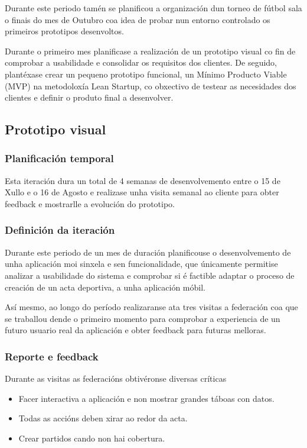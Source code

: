   Durante este periodo tamén se planificou a organización dun torneo de fútbol 
sala o finais do mes de Outubro coa idea de probar nun entorno 
controlado os primeiros prototipos desenvoltos.

  Durante o primeiro mes planificase a realización de un prototipo visual co 
fin de comprobar a usabilidade e consolidar os requisitos dos clientes.
  De seguido, plantéxase crear un pequeno prototipo funcional, un Mínimo 
Producto Viable (MVP) na metodoloxía Lean Startup, co obxectivo de testear as 
necesidades dos clientes e definir o produto final a desenvolver.

    \subsection{Prototipo visual}

      \subsubsection{Planificación temporal}
      Esta iteración dura un total de 4 semanas de desenvolvemento entre o 15 
de Xullo e o 16 de Agosto e realizase unha visita semanal ao cliente para obter 
feedback e mostrarlle a evolución do prototipo.

      \subsubsection{Definición da iteración}
      Durante este periodo de un mes de duración planificouse o desenvolvemento 
de unha aplicación moi sinxela e sen funcionalidade, que únicamente permitise 
analizar a usabilidade do sistema e comprobar si é factible adaptar o proceso 
de creación de un acta deportiva, a unha aplicación móbil.

    Así mesmo, ao longo do período realizaranse ata tres visitas a federación 
coa que se traballou dende o primeiro momento para comprobar a experiencia de 
un futuro usuario real da aplicación e obter feedback para futuras melloras.

      \subsubsection{Reporte e feedback}
      Durante as visitas as federacións obtivéronse diversas críticas 
      \begin{itemize}
        \item Facer interactiva a aplicación e non mostrar grandes táboas con 
datos.
        \item Todas as accións deben xirar ao redor da acta.
        \item Crear partidos cando non hai cobertura.
      \end{itemize}

